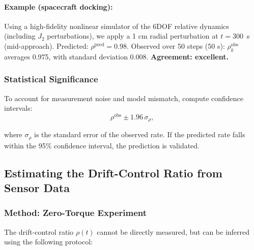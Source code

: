\paragraph{Example (spacecraft docking):}
Using a high-fidelity nonlinear simulator of the 6DOF relative dynamics (including
$J_2$ perturbations), we apply a 1 cm radial perturbation at $t = 300$~s (mid-approach).
Predicted: $\rho^{\text{pred}} = 0.98$. Observed over 50 steps (50 s): $\rho^{\text{obs}}_k$ averages 0.975,
with standard deviation 0.008. \textbf{Agreement: excellent.}

\subsubsection{Statistical Significance}

To account for measurement noise and model mismatch, compute confidence intervals:
\begin{equation}
\rho^{\text{obs}} \pm 1.96 \, \sigma_{\rho},
\label{eq:ch8:ci-rho}
\end{equation}

where $\sigma_{\rho}$ is the standard error of the observed rate. If the predicted rate
falls within the 95\% confidence interval, the prediction is validated.

\subsection{Estimating the Drift-Control Ratio from Sensor Data}

\subsubsection{Method: Zero-Torque Experiment}

The drift-control ratio $\rho(t)$ cannot be directly measured, but can be inferred
using the following protocol:

